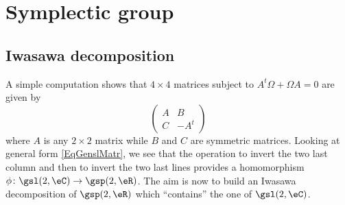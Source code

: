 \section{Symplectic group}		\label{SecSympleGp}

\subsection{Iwasawa decomposition}

A simple computation shows that $4\times 4$ matrices subject to $A^t\Omega+\Omega A=0$ are given by
\[
  \begin{pmatrix}
A&B\\
C&-A^t
\end{pmatrix}
\]
where $A$ is any $2\times 2$ matrix while $B$ and $C$ are symmetric matrices. Looking at general form \eqref{EqGenslMatr}, we see that the operation to invert the two last column and then to invert the two last lines provides a homomorphism $\phi\colon \gsl(2,\eC)\to \gsp(2,\eR)$. The aim is now to build an Iwasawa decomposition of $\gsp(2,\eR)$ which ``contains'' the one of $\gsl(2,\eC)$.

